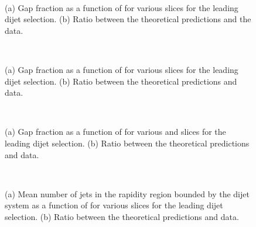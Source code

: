 \begin{figure}
\centering
\mbox{
              \quad
              \quad
}
\caption[Gap fraction as a function of  \dy{} for the leading \pt{} dijet selection]{
(a) Gap fraction as a function of \dy{} for various \ptb{} slices for the leading \pt{} dijet selection. 
(b) Ratio between the theoretical predictions and the data.
\label{GBJ1:dYSelA}}
\end{figure}



\begin{figure}
\centering
\mbox{
              \quad
              \quad
}
\caption[Gap fraction as a function of \ptb{} for leading \pt{} dijet selection]{ 
(a) Gap fraction as a function of \ptb{} for various \dy{} slices for the leading \pt{} dijet selection. 
(b) Ratio between the theoretical predictions and data.
\label{GBJ1:pTSelA}}
\end{figure}



\begin{figure}
\centering
\mbox{
              \quad
              \quad
}
\caption[Gap fraction as a function of \qz{} for leading \pt{} dijet selection]{ 
(a) Gap fraction as a function of \qz{} for various \dy{} and \ptb{} slices for the leading \pt{} dijet selection. 
(b) Ratio between the theoretical predictions and data. 
\label{GBJ1:Q0SelA}}
\end{figure}

\begin{figure}
\centering
\mbox{
              \quad
              \quad
}
\caption[Mean number of jets as a function of \dy{} for leading \pt{} dijet selection]{ 
(a) Mean number of jets in the rapidity region bounded by the dijet system as a function of \dy{} for various \ptb{} slices for the leading \pt{} dijet selection. 
(b) Ratio between the theoretical predictions and data. 
\label{GBJ1:NjetsdYSelA}}
\end{figure}

